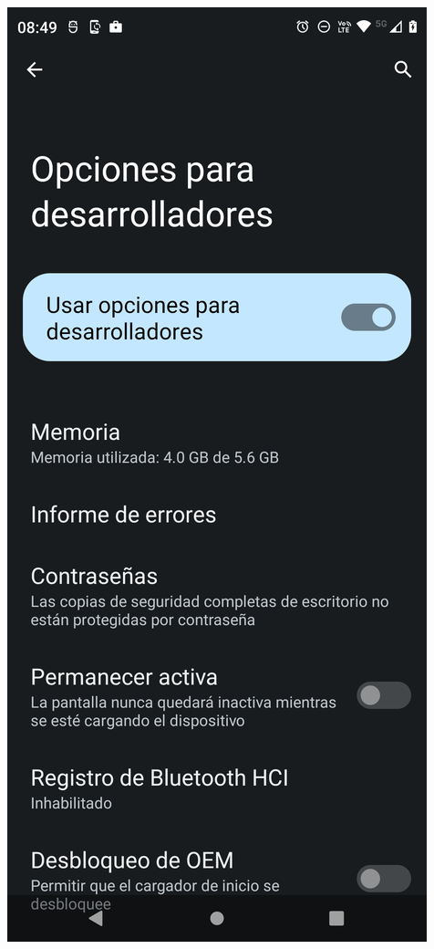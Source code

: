 \begin{frame}
\begin{columns}
\begin{center}
\end{center}
\begin{center}
\includegraphics[width=0.95\linewidth]{01_Configurar/ModoDesarrollador7.png}    

\end{center}
\end{columns}
\end{frame}
